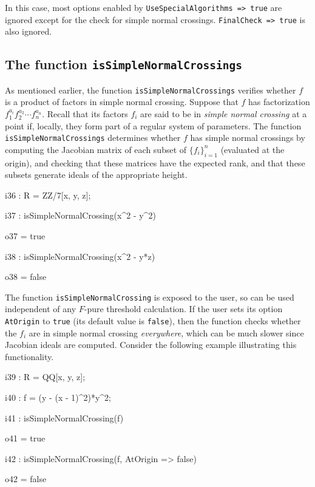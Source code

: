 \documentclass{amsart}
\begin{document}
\noindent In this case, most options enabled by \texttt{UseSpecialAlgorithms => true}
are ignored except for the check for simple normal crossings.  \texttt{FinalCheck => true}
is also ignored.

\subsection{The function \texttt{isSimpleNormalCrossings}} \label{subsec.SNC}
As mentioned earlier, the function \texttt{isSimpleNormalCrossings} verifies whether $f$ is a product of factors in simple normal crossing.
Suppose that $f$ has factorization $f_1^{a_i} f_2^{a_2} \cdots f_n^{a_n}$.  Recall that its factors $f_i$ are said to be in
\emph{simple normal crossing} at a point if, locally, they form part of a regular system of parameters.  The function \texttt{isSimpleNormalCrossings} determines whether $f$ has simple normal crossings by computing the Jacobian matrix of each subset of $\{ f_i \}_{i=1}^n$ (evaluated at the origin), and checking that these matrices have the expected rank, and that these subsets generate ideals of the appropriate height.

\medskip
{\small
{}
\begin{MyVerbatim}
i36 : R = ZZ/7[x, y, z];

i37 : isSimpleNormalCrossing(x^2 - y^2)

o37 = true

i38 : isSimpleNormalCrossing(x^2 - y*z)

o38 = false
\end{MyVerbatim}
}
\medskip

The function \texttt{isSimpleNormalCrossing} is exposed to the user, so can be used independent of any $F$-pure threshold calculation.
If the user sets its option \texttt{AtOrigin} to \texttt{true} (its default value is \texttt{false}), then the function checks whether the $f_i$ are in simple normal crossing \emph{everywhere}, which can be much slower since Jacobian ideals are computed. Consider the following example illustrating this functionality.

\medskip
{\small
{}
\begin{MyVerbatim}
i39 : R = QQ[x, y, z];

i40 : f = (y - (x - 1)^2)*y^2; 

i41 : isSimpleNormalCrossing(f)

o41 = true

i42 : isSimpleNormalCrossing(f, AtOrigin => false)

o42 = false
\end{MyVerbatim}
}
\medskip
\end{document}
